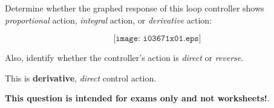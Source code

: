 

Determine whether the graphed response of this loop controller shows {\it proportional} action, {\it integral} action, or {\it derivative} action:

$$\texttt{[image: i03671x01.eps]}$$

Also, identify whether the controller's action is {\it direct} or {\it reverse}.







This is {\bf derivative}, {\it direct} control action.







{\bf This question is intended for exams only and not worksheets!}.


